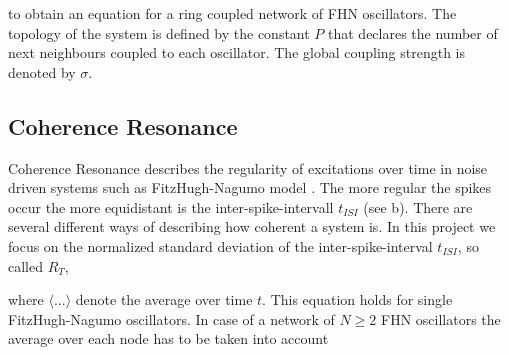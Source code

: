 

to obtain an equation for a ring coupled network of FHN oscillators. The topology of the system is defined by the constant $P$ that declares the number of next neighbours coupled to each oscillator. The global coupling strength is denoted by $\sigma$.   

\subsection{Coherence Resonance}

Coherence Resonance describes the regularity of excitations over time in noise driven systems such as FitzHugh-Nagumo model \cite{Pikovsky1997}. The more regular the spikes occur the more equidistant is the inter-spike-intervall $t_{ISI}$ (see b). There are several different ways of describing how coherent a system is. In this project we focus on the normalized standard deviation of the inter-spike-interval $t_{ISI}$, so called $R_T$,



where $\langle ... \rangle$ denote the average over time $t$. This equation holds for single FitzHugh-Nagumo oscillators. In case of a network of $N \geq 2$ FHN oscillators the average over each node has to be taken into account 




